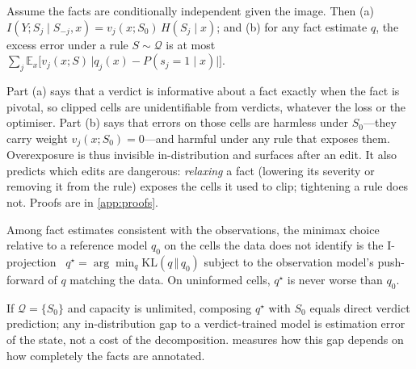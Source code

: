\begin{theorem}\label{thm:gap}
Assume the facts are conditionally independent given the image. Then (a) $I(Y;S_j\mid S_{-j},x)=v_j(x;S_0)\,H(S_j\mid x)$; and (b) for any fact estimate $q$, the excess error under a rule $S\sim\mathcal Q$ is at most $\sum_j\mathbb E_x\big[v_j(x;S)\,\lvert q_j(x)-P(s_j{=}1\mid x)\rvert\big]$.
\end{theorem}

\noindent Part (a) says that a verdict is informative about a fact exactly when the fact is pivotal, so clipped cells are unidentifiable from verdicts, whatever the loss or the optimiser. Part (b) says that errors on those cells are harmless under $S_0$---they carry weight $v_j(x;S_0)=0$---and harmful under any rule that exposes them. Overexposure is thus invisible in-distribution and surfaces after an edit. It also predicts which edits are dangerous: \emph{relaxing} a fact (lowering its severity or removing it from the rule) exposes the cells it used to clip; tightening a rule does not. Proofs are in \cref{app:proofs}.

\begin{theorem}\label{thm:mic}
Among fact estimates consistent with the observations, the minimax choice relative to a reference model $q_0$ on the cells the data does not identify is the I-projection~\cite{csiszar1975}
$q^\star=\arg\min_q\mathrm{KL}(q\,\Vert\,q_0)$ subject to the observation model's push-forward of $q$ matching the data. On uninformed cells, $q^\star$ is never worse than $q_0$.
\end{theorem}

\noindent If $\mathcal Q=\{S_0\}$ and capacity is unlimited, composing $q^\star$ with $S_0$ equals direct verdict prediction; any in-distribution gap to a verdict-trained model is estimation error of the state, not a cost of the decomposition.  measures how this gap depends on how completely the facts are annotated.
